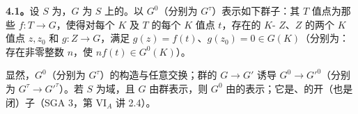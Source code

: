 \textbf{4.1。}设 $S$ 为，$G$ 为 $S$ 上的。以 $G^0$（分别为 $G^\tau$）表示如下群子：其 $T$ 值点为那些 $f:T\to G$，使得对每个 $K$ 及 $T$ 的每个 $K$ 值点 $t$，存在的 $K$- $Z$、$Z$ 的两个 $K$ 值点 $z,z_0$ 和 $g:Z\to G$，满足 $g(z)=f(t)$、$g(z_0)=0\in G(K)$（分别为：存在非零整数 $n$，使 $n f(t)\in G^0(K)$）。

显然，$G^0$（分别为 $G^\tau$）的构造与任意交换；群的 $G\to G'$ 诱导 $G^0\to G'^0$（分别为 $G^\tau\to G'^\tau$）。若 $S$ 为域，且 $G$ 由群表示，则 $G^0$ 由的表示；它是、的开（也是闭）子（SGA 3，第 VI$_A$ 讲 2.4）。

